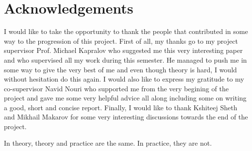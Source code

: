 \documentclass[11pt,titlepage]{report}
\begin{document}
\chapter*{Acknowledgements}
I would like to take the opportunity to thank the people that contributed in some way to the progression of this project. First of all, my thanks go to my project supervisor Prof. Michael Kapralov who suggested me this very interesting paper and who supervised all my work during this semester. He managed to push me in some way to give the very best of me and even though theory is hard, I would without hesitation do this again. I would also like to express my gratitude to my co-supervisor Navid Nouri who supported me from the very begining of the project and gave me some very helpful advice all along including some on writing a good, short and concise report. Finally, I would like to thank Kshiteej Sheth and Mikhail Makarov for some very interesting discussions towards the end of the project.
\vspace*{2cm}
\begin{fquote}
    In theory, theory and practice are the same. In practice, they are not.
\end{fquote} 
\newpage

\tableofcontents








\printbibliography

\appendix


\clearpage
\pagestyle{numberonly}
\end{document}
